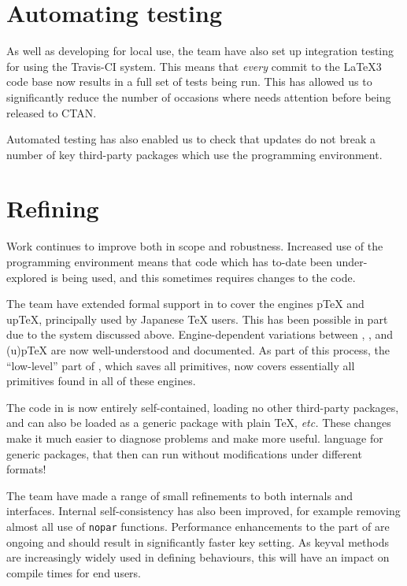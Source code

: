 \documentclass{ltnews}
\begin{document}
\section{Automating  testing}

As well as developing  for local use, the team have also set up
integration testing for  using the Travis-CI system. This means that
\emph{every} commit to the \LaTeX3 code base now results in a full set of tests
being run. This has allowed us to significantly reduce the number of occasions
where  needs attention before being released to CTAN.

Automated testing has also enabled us to check that  updates do not
break a number of key third-party packages which use the programming
environment.

\section{Refining }

Work continues to improve  both in scope and robustness. Increased
use of the programming environment means that code which has to-date been
under-explored is being used, and this sometimes requires changes to the code.

The team have extended formal support in  to cover the engines
p\TeX{} and up\TeX{}, principally used by Japanese \TeX{} users. This has been
possible in part due to the  system discussed above.
Engine-dependent variations between , ,
 and (u)p\TeX{} are now well-understood and documented. As part
of this process, the \enquote{low-level} part of , which saves all
primitives, now covers essentially all primitives found in all of these
engines.

The code in  is now entirely self-contained, loading no other
third-party packages, and can also be loaded as a generic package with plain
\TeX{}, \emph{etc.} These changes make it much easier to diagnose problems and
make  more useful. %
language for generic packages, that then can run without modifications under
different formats!

The team have made a range of small refinements to both internals and
 interfaces. Internal self-consistency has also been improved, for
example removing almost all use of \texttt{nopar} functions. Performance
enhancements to the  part of  are ongoing and should
result in significantly faster key setting. As keyval methods are increasingly
widely used in defining behaviours, this will have an impact on compile times
for end users.
\end{document}
